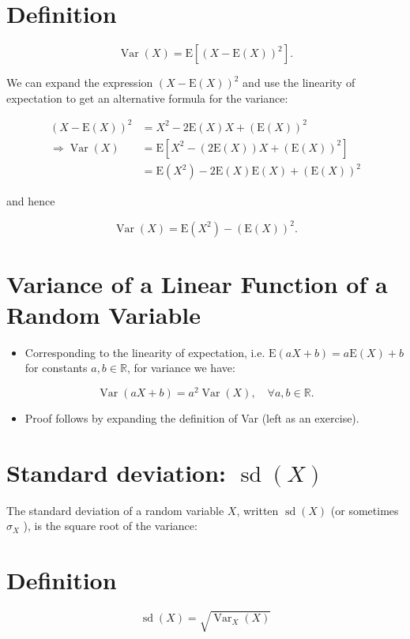 \documentclass[10pt]{article}
\begin{document}
\section*{Definition}
$$
\operatorname{Var}(X)=\mathrm{E}\left[(X-\mathrm{E}(X))^{2}\right] .
$$

We can expand the expression $(X-\mathrm{E}(X))^{2}$ and use the linearity of expectation to get an alternative formula for the variance:

$$
\begin{aligned}
(X-\mathrm{E}(X))^{2} & =X^{2}-2 \mathrm{E}(X) X+(\mathrm{E}(X))^{2} \\
\Rightarrow \operatorname{Var}(X) & =\mathrm{E}\left[X^{2}-(2 \mathrm{E}(X)) X+(\mathrm{E}(X))^{2}\right] \\
& =\mathrm{E}\left(X^{2}\right)-2 \mathrm{E}(X) \mathrm{E}(X)+(\mathrm{E}(X))^{2}
\end{aligned}
$$

and hence

$$
\operatorname{Var}(X)=\mathrm{E}\left(X^{2}\right)-(\mathrm{E}(X))^{2} .
$$

\section*{Variance of a Linear Function of a Random Variable}
\begin{itemize}
  \item Corresponding to the linearity of expectation, i.e. $\mathrm{E}(a X+b)=a \mathrm{E}(X)+b$ for constants $a, b \in \mathbb{R}$, for variance we have:
\end{itemize}

$$
\operatorname{Var}(a X+b)=a^{2} \operatorname{Var}(X), \quad \forall a, b \in \mathbb{R} .
$$

\begin{itemize}
  \item Proof follows by expanding the definition of Var (left as an exercise).
\end{itemize}

\section*{Standard deviation: $\operatorname{sd}(X)$}
The standard deviation of a random variable $X$, written $\operatorname{sd}(X)$ (or sometimes $\sigma_{X}$ ), is the square root of the variance:

\section*{Definition}
$$
\operatorname{sd}(X)=\sqrt{\operatorname{Var}_{X}(X)}
$$
\end{document}

